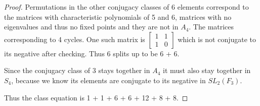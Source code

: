 \documentclass{article}
\begin{document}
\begin{proof}
    Permutations in the other conjugacy classes of 6 elements correspond to the matrices with characteristic polynomials of 5 and 6, matrices with no eigenvalues and thus no fixed points and they are not in $A_4$. The matrices corresponding to 4 cycles. One such matrix is $\begin{bmatrix}
        1 & 1 \\ 1 & 0
    \end{bmatrix}$ which is not conjugate to its negative after checking. Thus 6 splits up to be 6 + 6. 

    Since the conjugacy class of 3 stays together in $A_4$ it must also stay together in $S_4$, because we know its elements are conjugate to its negative in $SL_2(F_3)$.

    Thus the class equation is 1 + 1 + 6 + 6 + 12 + 8 + 8.
\end{proof}
\end{document}
